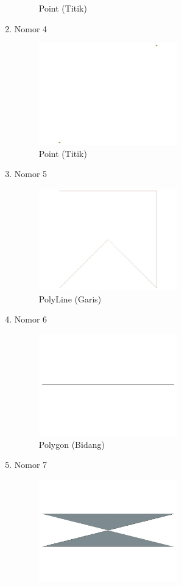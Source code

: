 \begin{enumerate}
\begin{figure}[H]
		\centering
		\caption{Point (Titik)}
	\end{figure}
	\item Nomor 4
	
	\begin{figure}[H]
		\includegraphics[width=6cm]{figures/Tugas2/1174070/No4.jpeg}
		\centering
		\caption{Point (Titik)}
	\end{figure}
	\item Nomor 5
	
	\begin{figure}[H]
		\includegraphics[width=6cm]{figures/Tugas2/1174070/No5.jpeg}
		\centering
		\caption{PolyLine (Garis)}
	\end{figure}
	\item Nomor 6
	
	\begin{figure}[H]
		\includegraphics[width=6cm]{figures/Tugas2/1174070/No6.jpeg}
		\centering
		\caption{Polygon (Bidang)}
	\end{figure}
	\item Nomor 7
	
	\begin{figure}[H]
		\includegraphics[width=6cm]{figures/Tugas2/1174070/No7.jpeg}

\end{figure}
\end{enumerate}
